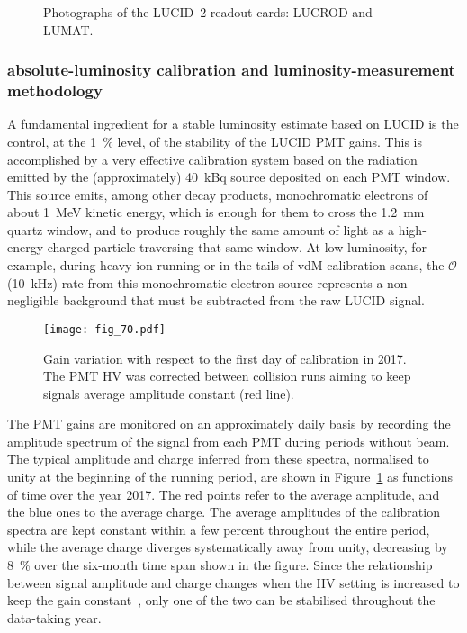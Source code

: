 \documentclass[cernpreprint, atlasdraft=false, UKenglish,british,orcidlogo, texmf, orcidlogo]{atlasdoc}
\begin{document}
\begin{figure}[htbp]
\caption{Photographs of the  \gls{LUCID}~2 readout cards: \protect{} \gls{LUCROD} and \protect{} \gls{LUMAT}.
}
\end{figure}
\subsubsection{ absolute-luminosity calibration and luminosity-measurement methodology}\label{lucid_control}
 
A fundamental ingredient for a stable luminosity estimate based on \gls{LUCID} is the control, at the \SI{1}{\percent} level, of the stability of the \gls{LUCID} \gls{PMT} gains. This is accomplished by a very effective calibration system based on the radiation emitted by the (approximately)  \SI{40}{\kilo\becquerel} \Bisource source deposited on each \gls{PMT} window. This source emits, among other decay products, monochromatic electrons of about \SI{1}{\MeV} kinetic energy, which is enough for them to cross the \SI{1.2}{\mm} quartz window, and to produce roughly the same amount of light as a high-energy charged particle traversing that same window. At low luminosity, for example, during heavy-ion running or in the tails of \gls{vdM}-calibration scans, the $\mathcal{O}$\mbox{(\SI{10}{\kHz})} rate from this monochromatic electron source represents a non-negligible background that must be subtracted from the raw LUCID signal.
 
\begin{figure}[htbp]
\texttt{[image: fig\_70.pdf]}
\caption{Gain variation with respect to the first day of calibration in 2017. The \gls{PMT} \gls{HV} was corrected between collision runs aiming to keep \Bisource signals average amplitude constant (red line).}
\label{fig:lucid_calibration}
\end{figure}
 
The \gls{PMT} gains are monitored on an approximately daily basis by recording the amplitude spectrum of the \Bisource signal from each \gls{PMT} during periods without beam. The typical amplitude and charge inferred from these spectra, normalised to unity at the beginning of the running period, are shown in Figure~\ref{fig:lucid_calibration} as functions of time over the year 2017. The red points refer to the average amplitude, and the blue ones to the average charge. The average amplitudes of the calibration spectra are kept constant within a few percent throughout the entire period, while the average charge diverges systematically away from unity, decreasing by \SI{8}{\percent} over the six-month time span shown in the figure. Since the relationship between signal amplitude and charge changes when the \gls{HV} setting is increased to keep the gain constant~\cite{lucid2}, only one of the two can be stabilised throughout the data-taking year.
 
\end{document}
